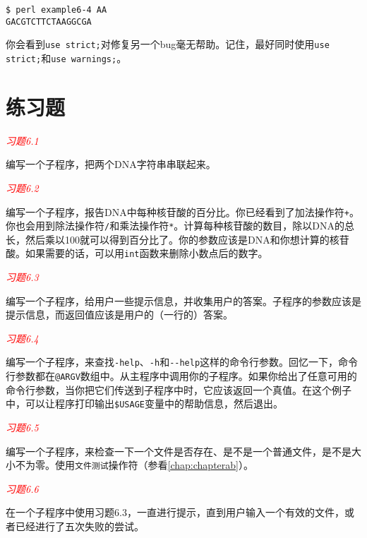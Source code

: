 \begin{lstlisting}
$ perl example6-4 AA
GACGTCTTCTAAGGCGA
\end{lstlisting}

你会看到\verb|use strict;|对修复另一个bug毫无帮助。记住，最好同时使用\verb|use strict;|和\verb|use warnings;|。

\section{练习题}
\textcolor{red}{\textit{习题6.1}}
\begin{adjustwidth}{1cm}{}
编写一个子程序，把两个DNA字符串串联起来。
\end{adjustwidth}

\textcolor{red}{\textit{习题6.2}}
\begin{adjustwidth}{1cm}{}
编写一个子程序，报告DNA中每种核苷酸的百分比。你已经看到了加法操作符\verb|+|。你也会用到除法操作符\verb|/|和乘法操作符\verb|*|。计算每种核苷酸的数目，除以DNA的总长，然后乘以100就可以得到百分比了。你的参数应该是DNA和你想计算的核苷酸。如果需要的话，可以用\verb|int|函数来删除小数点后的数字。
\end{adjustwidth}

\textcolor{red}{\textit{习题6.3}}
\begin{adjustwidth}{1cm}{}
编写一个子程序，给用户一些提示信息，并收集用户的答案。子程序的参数应该是提示信息，而返回值应该是用户的（一行的）答案。
\end{adjustwidth}

\textcolor{red}{\textit{习题6.4}}
\begin{adjustwidth}{1cm}{}
编写一个子程序，来查找\verb|-help|、\verb|-h|和\verb|--help|这样的命令行参数。回忆一下，命令行参数都在\verb|@ARGV|数组中。从主程序中调用你的子程序。如果你给出了任意可用的命令行参数，当你把它们传送到子程序中时，它应该返回一个真值。在这个例子中，可以让程序打印输出\verb|$USAGE|变量中的帮助信息，然后退出。
\end{adjustwidth}

\textcolor{red}{\textit{习题6.5}}
\begin{adjustwidth}{1cm}{}
编写一个子程序，来检查一下一个文件是否存在、是不是一个普通文件，是不是大小不为零。使用\verb|文件测试|操作符（参看\autoref{chap:chapterab}）。
\end{adjustwidth}

\textcolor{red}{\textit{习题6.6}}
\begin{adjustwidth}{1cm}{}
在一个子程序中使用习题6.3，一直进行提示，直到用户输入一个有效的文件，或者已经进行了五次失败的尝试。
\end{adjustwidth}

